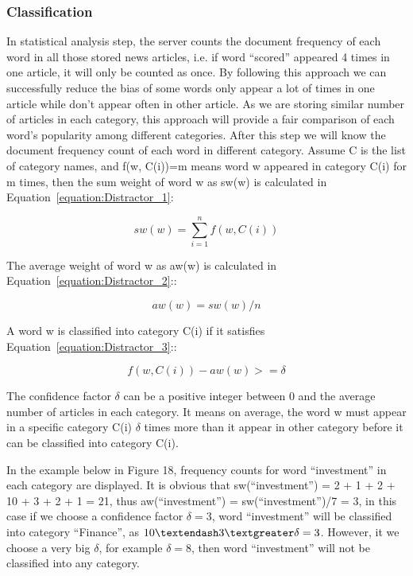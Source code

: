 \subsubsection{Classification}
In statistical analysis step, the server counts the document frequency of each word in all those stored news articles, i.e. if word “scored” appeared 4 times in one article, it will only be counted as once. By following this approach we can successfully reduce the bias of some words only appear a lot of times in one article while don’t appear often in other article. As we are storing similar number of articles in each category, this approach will provide a fair comparison of each word’s popularity among different categories. After this step we will know the document frequency count of each word in different category. 
Assume C is the list of category names, and f(w, C(i))=m means word w appeared in category C(i) for m times, then the sum weight of word w as sw(w) is calculated in Equation~\ref{equation:Distractor_1}:

\begin{equation}
sw (w) = \sum_{i=1}^{n} f(w,C(i))
\label{equation:Distractor_1}
\end{equation}  

The average weight of word w as aw(w) is calculated in Equation~\ref{equation:Distractor_2}::

\begin{equation}
aw (w) = sw (w)/n 
\label{equation:Distractor_2} 
\end{equation}  

A word w is classified into category C(i) if it satisfies Equation~\ref{equation:Distractor_3}::

\begin{equation}
f (w, C(i)) - aw(w) >= \delta
\label{equation:Distractor_3} 
\end{equation}  

The confidence factor $\delta$ can be a positive integer between 0 and the average number of articles in each category. It means on average, the word w must appear in a specific category C(i) $\delta$ times more than it appear in other category before it can be classified into category C(i).

In the example below in Figure 18, frequency counts for word “investment” in each category are displayed. It is obvious that sw(“investment”) = 2 + 1 + 2 + 10 + 3 + 2 + 1 = 21, thus aw(“investment”) = sw(“investment”)/7 = 3, in this case if we choose a confidence factor $\delta=3$, word “investment” will be classified into category “Finance”, as $10 – 3 \textgreater \delta=3$. However, it we choose a very big $\delta$, for example $\delta=8$, then word “investment” will not be classified into any category.

